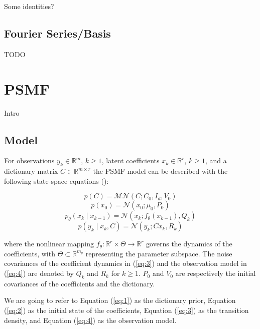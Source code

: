 \documentclass{mldsmsc}
\begin{document}
Some identities?

\subsection{Fourier Series/Basis}

TODO

\section{PSMF}

Intro

\subsection{Model}

For observations $y_k \in \mathbb{R}^{m}$, $k \geq 1$, latent coefficients $x_k \in \mathbb{R}^{r}$, $k \geq 1$, and a dictionary matrix $C \in \mathbb{R}^{m \times r}$ the PSMF model can be described with the following state-space equations (\cite{akyildiz2021probabilistic}):

\begin{equation} \label{eq:1}
    p(C) = \mathcal{MN}(C; C_0, I_d, V_0)
\end{equation}
\begin{equation} \label{eq:2}
    p(x_0) = \mathcal{N}(x_0; \mu_0, P_0)
\end{equation}
\begin{equation} \label{eq:3}
    p_{\theta}(x_k \mid x_{k-1}) = \mathcal{N}(x_k; f_{\theta}(x_{k-1}), Q_k)
\end{equation}
\begin{equation} \label{eq:4}
    p(y_k \mid x_k, C) = \mathcal{N}(y_k; Cx_k, R_k)
\end{equation}

\noindent where the nonlinear mapping $f_{\theta} : \mathbb{R}^{r} \times \Theta \rightarrow \mathbb{R}^{r}$ governs the dynamics of the coefficients, with $\Theta \subset \mathbb{R}^{m_{\theta}}$ representing the parameter subspace. The noise covariances of the coefficient dynamics in (\ref{eq:3}) and the observation model in (\ref{eq:4}) are denoted by $Q_k$ and $R_k$ for $k \geq 1$. $P_0$ and $V_0$ are respectively the initial covariances of the coefficients and the dictionary. \newline

\noindent We are going to refer to Equation (\ref{eq:1}) as the dictionary prior, Equation (\ref{eq:2}) as the initial state of the coefficients, Equation (\ref{eq:3}) as the transition density, and Equation (\ref{eq:4}) as the observation model.
\end{document}
